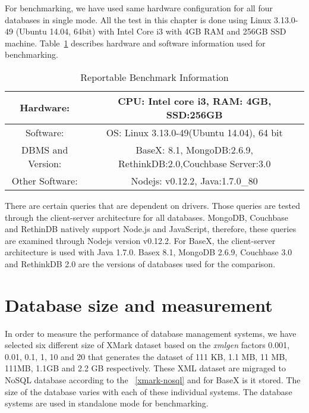 For benchmarking, we have used same hardware configuration for all four databases in single mode. All the test in this chapter is done using  Linux 3.13.0-49 (Ubuntu 14.04, 64bit) with Intel Core i3 with 4GB RAM and 256GB SSD machine.
Table~\ref{benchmark-configuration-table} describes hardware and software information used for benchmarking. 
\begin{table}[h]	
	\centering
	\caption{Reportable Benchmark Information}
	\begin{tabular}{|c|c|c|c} 
		\hline
		Hardware: & \multicolumn{3}{|c|}{CPU: Intel core i3, RAM: 4GB, SSD:256GB  } \\
		\hline
		Software: & \multicolumn{3}{|c|}{OS: Linux 3.13.0-49(Ubuntu 14.04), 64 bit} \\
		\hline
		DBMS and Version: & \multicolumn{3}{|c|}{ BaseX: 8.1, MongoDB:2.6.9, RethinkDB:2.0,Couchbase Server:3.0 } \\
		\hline
		Other Software: & \multicolumn{3}{|c|}{Nodejs: v0.12.2, Java:1.7.0\_80 } \\
		\hline
	\end{tabular}	
	\label{benchmark-configuration-table}
\end{table}
There are certain queries that are dependent on drivers. Those queries are tested through the client-server architecture for all databases. MongoDB, Couchbase and RethinDB natively support Node.js and JavaScript, therefore, these queries are examined through Nodejs version  v0.12.2. For BaseX, the client-server architecture is used with Java 1.7.0. Basex 8.1, MongoDB 2.6.9, Couchbase 3.0 and RethinkDB 2.0 are the versions of databases used for the comparison. 
\par
\section{Database size and measurement}
In order to measure the performance of database management systems, we have selected six different size of XMark dataset based on the \textit{xmlgen} factors 0.001, 0.01, 0.1, 1, 10 and 20 that generates the dataset of 111 KB, 1.1 MB, 11 MB, 111MB, 1.1GB and 2.2 GB respectively. These XML dataset are migraged to NoSQL database according to the ~\ref{xmark-nosql} and for BaseX is it stored. The size of the database varies with each of these individual systems. The database systems are used in standalone mode for benchmarking. 